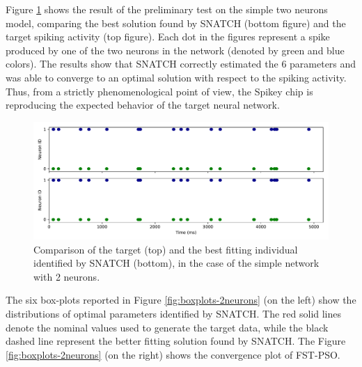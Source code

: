 \documentclass[utf8]{frontiersFPHY} %
\newcommand {\name}{SNATCH}
\begin{document}

Figure \ref{fig:target-2neurons} shows the result of the preliminary test on the simple two neurons model, comparing the best solution found by \name{} (bottom figure) and the target spiking activity (top figure).
Each dot in the figures represent a spike produced by one of the two neurons in the network (denoted by green and blue colors).
The results show that \name{} correctly estimated  the 6 parameters and was able to converge to an optimal solution with respect to the spiking activity.
Thus, from a strictly phenomenological point of view, the Spikey chip is reproducing the expected behavior of the target neural network.

\begin{figure}[!ht]
	\centering
	\includegraphics[width=\textwidth]{images/2-neurons-irregular/target_sim.pdf}
	\caption{Comparison of the target (top) and the best fitting individual identified by \name{} (bottom), in the case of the simple network with 2 neurons.}
	\label{fig:target-2neurons}
\end{figure}

The six box-plots reported in Figure \ref{fig:boxplots-2neurons} (on the left) show the distributions of optimal parameters identified by \name{}.
The red solid lines denote the nominal values used to generate the target data, while the black dashed line represent the better fitting solution found by \name{}. 
The Figure \ref{fig:boxplots-2neurons} (on the right) shows the convergence plot of FST-PSO. 
\end{document}
